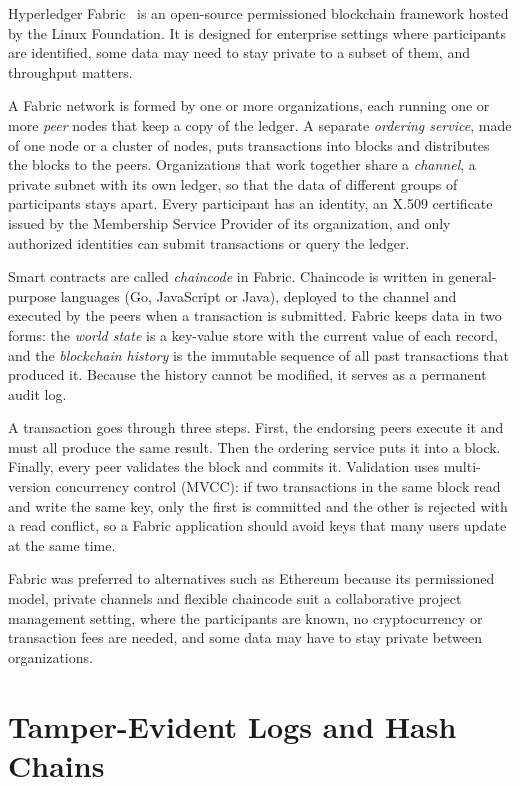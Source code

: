 Hyperledger Fabric~\cite{fabric,androulaki2018} is an open-source permissioned blockchain framework hosted by the Linux Foundation. It is designed for enterprise settings where participants are identified, some data may need to stay private to a subset of them, and throughput matters.

A Fabric network is formed by one or more organizations, each running one or more \emph{peer} nodes that keep a copy of the ledger. A separate \emph{ordering service}, made of one node or a cluster of nodes, puts transactions into blocks and distributes the blocks to the peers. Organizations that work together share a \emph{channel}, a private subnet with its own ledger, so that the data of different groups of participants stays apart. Every participant has an identity, an X.509 certificate issued by the Membership Service Provider of its organization, and only authorized identities can submit transactions or query the ledger.

Smart contracts are called \emph{chaincode} in Fabric. Chaincode is written in general-purpose languages (Go, JavaScript or Java), deployed to the channel and executed by the peers when a transaction is submitted. Fabric keeps data in two forms: the \emph{world state} is a key-value store with the current value of each record, and the \emph{blockchain history} is the immutable sequence of all past transactions that produced it. Because the history cannot be modified, it serves as a permanent audit log.

A transaction goes through three steps. First, the endorsing peers execute it and must all produce the same result. Then the ordering service puts it into a block. Finally, every peer validates the block and commits it. Validation uses multi-version concurrency control (MVCC): if two transactions in the same block read and write the same key, only the first is committed and the other is rejected with a read conflict, so a Fabric application should avoid keys that many users update at the same time.

Fabric was preferred to alternatives such as Ethereum because its permissioned model, private channels and flexible chaincode suit a collaborative project management setting, where the participants are known, no cryptocurrency or transaction fees are needed, and some data may have to stay private between organizations.

\section{Tamper-Evident Logs and Hash Chains}
\label{sec:hash-chains}

